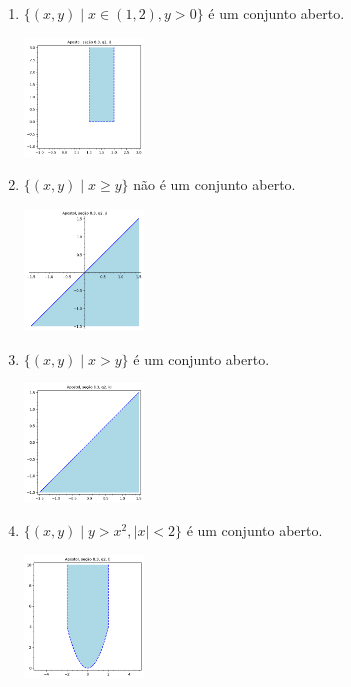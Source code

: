 \documentclass[../main.tex]{subfiles}
\begin{document}
\begin{solucao}
\begin{enumerate}[label=\alph*)]
\begin{center}
				\end{center}
				\item $\{(x,y) \mid x\in (1,2), y>0\}$ é um conjunto aberto.
				\begin{center}
					\includegraphics[width=0.25\textwidth]{imagens/lista03/picture_lista03.02_q01_item09.png}
				\end{center}
				\item $\{(x,y) \mid x\geq y\}$ não é um conjunto aberto.
				\begin{center}
				\includegraphics[width=0.25\textwidth]{imagens/lista03/picture_lista03.02_q01_item10.png}
				\end{center}
				\item $\{(x,y) \mid x> y\}$ é um conjunto aberto.
				\begin{center}
				\includegraphics[width=0.25\textwidth]{imagens/lista03/picture_lista03.02_q01_item11.png}
				\end{center}
				\item $\{(x,y) \mid y>x^2, |x|<2\}$ é um conjunto aberto.
				\begin{center}
				\includegraphics[width=0.25\textwidth]{imagens/lista03/picture_lista03.02_q01_item12.png}

\end{center}
\end{enumerate}
\end{solucao}
\end{document}
